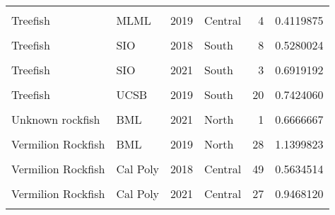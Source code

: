 \documentclass[
]{article}
\begin{document}
\begin{longtable}[t]{llrlrr}
\cellcolor{gray!6}{Treefish} & \cellcolor{gray!6}{Cal Poly} & \cellcolor{gray!6}{2021} & \cellcolor{gray!6}{Central} & \cellcolor{gray!6}{13} & \cellcolor{gray!6}{0.8749253}\\
\addlinespace
Treefish & MLML & 2019 & Central & 4 & 0.4119875\\
\cellcolor{gray!6}{Treefish} & \cellcolor{gray!6}{MLML} & \cellcolor{gray!6}{2021} & \cellcolor{gray!6}{Central} & \cellcolor{gray!6}{1} & \cellcolor{gray!6}{0.4444444}\\
Treefish & SIO & 2018 & South & 8 & 0.5280024\\
\cellcolor{gray!6}{Treefish} & \cellcolor{gray!6}{SIO} & \cellcolor{gray!6}{2019} & \cellcolor{gray!6}{South} & \cellcolor{gray!6}{15} & \cellcolor{gray!6}{0.4560431}\\
Treefish & SIO & 2021 & South & 3 & 0.6919192\\
\addlinespace
\cellcolor{gray!6}{Treefish} & \cellcolor{gray!6}{UCSB} & \cellcolor{gray!6}{2018} & \cellcolor{gray!6}{South} & \cellcolor{gray!6}{28} & \cellcolor{gray!6}{0.7404476}\\
Treefish & UCSB & 2019 & South & 20 & 0.7424060\\
\cellcolor{gray!6}{Treefish} & \cellcolor{gray!6}{UCSB} & \cellcolor{gray!6}{2021} & \cellcolor{gray!6}{South} & \cellcolor{gray!6}{24} & \cellcolor{gray!6}{0.4866991}\\
Unknown rockfish & BML & 2021 & North & 1 & 0.6666667\\
\cellcolor{gray!6}{Vermilion Rockfish} & \cellcolor{gray!6}{BML} & \cellcolor{gray!6}{2018} & \cellcolor{gray!6}{North} & \cellcolor{gray!6}{6} & \cellcolor{gray!6}{0.4037594}\\
\addlinespace
Vermilion Rockfish & BML & 2019 & North & 28 & 1.1399823\\
\cellcolor{gray!6}{Vermilion Rockfish} & \cellcolor{gray!6}{BML} & \cellcolor{gray!6}{2021} & \cellcolor{gray!6}{North} & \cellcolor{gray!6}{17} & \cellcolor{gray!6}{0.9212291}\\
Vermilion Rockfish & Cal Poly & 2018 & Central & 49 & 0.5634514\\
\cellcolor{gray!6}{Vermilion Rockfish} & \cellcolor{gray!6}{Cal Poly} & \cellcolor{gray!6}{2019} & \cellcolor{gray!6}{Central} & \cellcolor{gray!6}{50} & \cellcolor{gray!6}{0.7269269}\\
Vermilion Rockfish & Cal Poly & 2021 & Central & 27 & 0.9468120\\
\addlinespace
\cellcolor{gray!6}{Vermilion Rockfish} & \cellcolor{gray!6}{HSU} & \cellcolor{gray!6}{2018} & \cellcolor{gray!6}{North} & \cellcolor{gray!6}{26} & \cellcolor{gray!6}{1.5743669}\\

\end{longtable}
\end{document}
